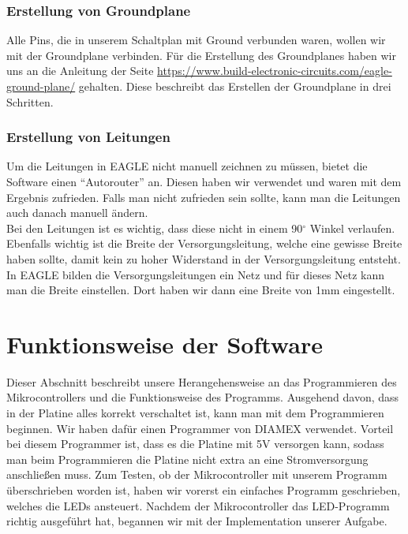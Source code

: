 \documentclass[]{article}
\begin{document}
\subsubsection{Erstellung von Groundplane}
Alle Pins, die in unserem Schaltplan mit Ground verbunden waren, wollen wir mit der Groundplane verbinden. Für die Erstellung des Groundplanes haben wir uns an die Anleitung der Seite \url{https://www.build-electronic-circuits.com/eagle-ground-plane/} gehalten. Diese beschreibt das Erstellen der Groundplane in drei Schritten.

\subsubsection{Erstellung von Leitungen}
Um die Leitungen in EAGLE nicht manuell zeichnen zu müssen, bietet die Software einen "`Autorouter"' an. Diesen haben wir verwendet und waren mit dem Ergebnis zufrieden. Falls man nicht zufrieden sein sollte, kann man die Leitungen auch danach manuell ändern.
\\Bei den Leitungen ist es wichtig, dass diese nicht in einem 90$^\circ$ Winkel verlaufen. Ebenfalls wichtig ist die Breite der Versorgungsleitung, welche eine gewisse Breite haben sollte, damit kein zu hoher Widerstand in der Versorgungsleitung entsteht. In EAGLE bilden die Versorgungsleitungen ein Netz und für dieses Netz kann man die Breite einstellen. Dort haben wir dann eine Breite von 1mm eingestellt.



\section{Funktionsweise der Software}
Dieser Abschnitt beschreibt unsere Herangehensweise an das Programmieren des Mikrocontrollers und die Funktionsweise des Programms. Ausgehend davon, dass in der Platine alles korrekt verschaltet ist, kann man mit dem Programmieren beginnen. Wir haben dafür einen Programmer von DIAMEX verwendet. Vorteil bei diesem Programmer ist, dass es die Platine mit 5V versorgen kann, sodass man beim Programmieren die Platine nicht extra an eine Stromversorgung anschließen muss. 
Zum Testen, ob der Mikrocontroller mit unserem Programm überschrieben worden ist, haben wir vorerst ein einfaches Programm geschrieben, welches die LEDs ansteuert. Nachdem der Mikrocontroller das LED-Programm richtig ausgeführt hat, begannen wir mit der Implementation unserer Aufgabe.
\end{document}
